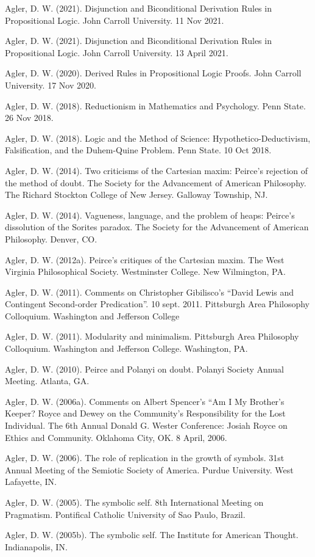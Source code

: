 \documentclass[p1noheader, 11pt]{../lightcv}
\begin{document}
\begin{rlist}[Talks]
    \item Agler, D. W. (2021). Disjunction and Biconditional Derivation Rules in Propositional Logic. John Carroll University. 11 Nov 2021.
    \item Agler, D. W. (2021). Disjunction and Biconditional Derivation Rules in Propositional Logic. John Carroll University. 13 April 2021.
    \item Agler, D. W. (2020). Derived Rules in Propositional Logic Proofs. John Carroll University. 17 Nov 2020.
    \item Agler, D. W. (2018). Reductionism in Mathematics and Psychology. Penn State. 26 Nov 2018.
    \item Agler, D. W. (2018). Logic and the Method of Science: Hypothetico-Deductivism, Falsification, and the Duhem-Quine Problem. Penn State. 10 Oct 2018.
    \item Agler, D. W. (2014). Two criticisms of the Cartesian maxim: Peirce’s rejection of the method of doubt. The Society for the Advancement of American Philosophy. The Richard Stockton College of New Jersey. Galloway Township, NJ.
    \item Agler, D. W. (2014). Vagueness, language, and the problem of heaps: Peirce’s dissolution of the Sorites paradox. The Society for the Advancement of American Philosophy. Denver, CO.
    \item Agler, D. W. (2012a). Peirce’s critiques of the Cartesian maxim. The West Virginia Philosophical Society. Westminster College. New Wilmington, PA.
    \item Agler, D. W. (2011). Comments on Christopher Gibilisco’s “David Lewis and Contingent Second-order Predication”. 10 sept. 2011. Pittsburgh Area Philosophy Colloquium. Washington and Jeﬀerson
    College
    \item Agler, D. W. (2011). Modularity and minimalism. Pittsburgh Area Philosophy Colloquium. Washington and Jefferson College. Washington, PA.
    \item Agler, D. W. (2010). Peirce and Polanyi on doubt. Polanyi Society Annual Meeting. Atlanta, GA.
    \item Agler, D. W. (2006a). Comments on Albert Spencer’s “Am I My Brother’s Keeper? Royce and Dewey on the Community’s Responsibility for the Lost Individual. The 6th Annual Donald G. Wester Conference: Josiah Royce on Ethics and Community. Oklahoma City, OK. 8 April, 2006.
    \item Agler, D. W. (2006). The role of replication in the growth of symbols. 31st Annual Meeting of the Semiotic Society of America. Purdue University. West Lafayette, IN.
    \item Agler, D. W. (2005). The symbolic self. 8th International Meeting on Pragmatism. Pontifical Catholic University of Sao Paulo, Brazil.
    \item Agler, D. W. (2005b). The symbolic self. The Institute for American Thought. Indianapolis, IN.
\end{rlist}
\end{document}
